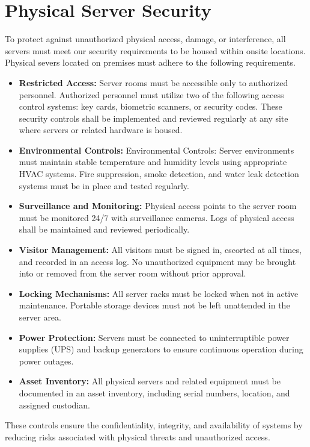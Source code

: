 \section{Physical Server Security}
To protect against unauthorized physical access, damage, or interference, all servers must meet our security requirements to be housed within onsite locations. Physical severs located on premises must adhere to the following requirements.
\begin{itemize}
    \item \textbf{Restricted Access:}
    Server rooms must be accessible only to authorized personnel. Authorized personnel must  utilize two of the following access control systems: key cards, biometric scanners, or security codes. These security controls shall be implemented and reviewed regularly at any site where servers or related hardware is housed.
    \item \textbf{Environmental Controls:}
    Environmental Controls: Server environments must maintain stable temperature and humidity levels using appropriate HVAC systems. Fire suppression, smoke detection, and water leak detection systems must be in place and tested regularly.
    \item \textbf{Surveillance and Monitoring:}
    Physical access points to the server room must be monitored 24/7 with surveillance cameras. Logs of physical access shall be maintained and reviewed periodically.
    \item \textbf{Visitor Management:}
     All visitors must be signed in, escorted at all times, and recorded in an access log. No unauthorized equipment may be brought into or removed from the server room without prior approval.
     \item \textbf{Locking Mechanisms:}
     All server racks must be locked when not in active maintenance. Portable storage devices must not be left unattended in the server area.
     \item \textbf{Power Protection:}
     Servers must be connected to uninterruptible power supplies (UPS) and backup generators to ensure continuous operation during power outages.
     \item \textbf{Asset Inventory:}
     All physical servers and related equipment must be documented in an asset inventory, including serial numbers, location, and assigned custodian.
\end{itemize}
These controls ensure the confidentiality, integrity, and availability of systems by reducing risks associated with physical threats and unauthorized access.

